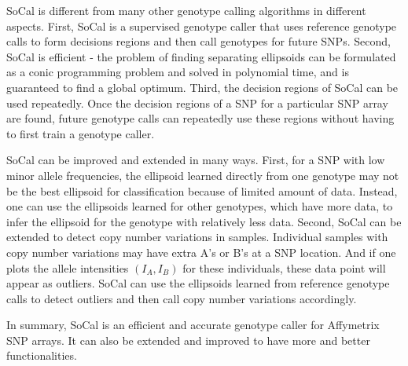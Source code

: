 \documentclass{scrartcl}
\begin{document}
\par
SoCal is different from many other genotype calling algorithms in different
aspects.
First, SoCal is a supervised genotype caller that uses reference genotype calls
to form decisions regions and then call genotypes for future SNPs.
Second, SoCal is efficient - the problem of finding separating ellipsoids
can be formulated as a conic programming problem and solved in polynomial time,
and is guaranteed to find a global optimum.
Third, the decision regions of SoCal can be used repeatedly.
Once the decision regions of a SNP for a particular SNP array are found,
future genotype calls can repeatedly use these regions without having to
first train a genotype caller.

\par
SoCal can be improved and extended in many ways.
First, for a SNP with low minor allele frequencies, the ellipsoid learned 
directly from one genotype may not be the best ellipsoid for classification
because of limited amount of data.
Instead, one can use the ellipsoids learned for other genotypes, which have
more data, to infer the ellipsoid for the genotype with relatively less data.
Second, SoCal can be extended to detect copy number variations in samples.
Individual samples with copy number variations may have extra A's or B's at
a SNP location. And if one plots the allele intensities $(I_A,I_B)$ for these
individuals, these data point will appear as outliers.
SoCal can use the ellipsoids learned from reference genotype calls to detect
outliers and then call copy number variations accordingly.

\par
In summary, SoCal is an efficient and accurate genotype caller for Affymetrix
SNP arrays. It can also be extended and improved to have more and
better functionalities.
\end{document}
